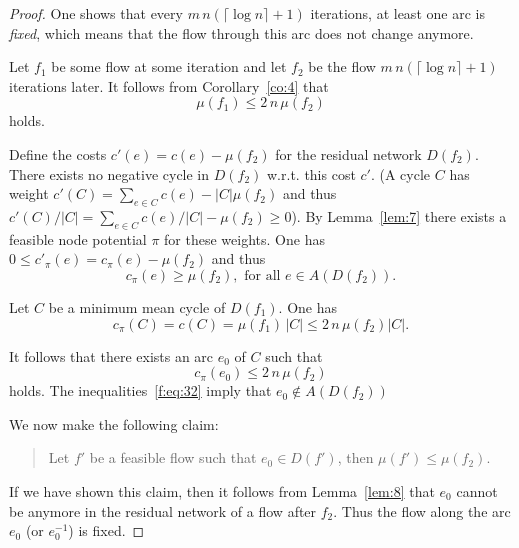 \begin{proof}
  One shows that every $m\, n  (\lceil\log n\rceil+1)$ iterations, at least one
  arc is \emph{fixed}, which means that the flow through  this arc
  does not change anymore. 
  
  Let $f_1$ be some flow at some iteration and let $f_2$ be the flow
  $m\, n  (\lceil\log n\rceil+1)$ iterations later. 
  It follows from Corollary~\ref{co:4} that 
  \begin{equation}
    \label{f:eq:33}
    \mu(f_1)\leq 2 \, n \, \mu(f_2) 
  \end{equation}
  holds. 
  
  Define the costs $c'(e) = c(e) - \mu(f_2)$ for the residual network
  $D(f_2)$. There exists no negative cycle in $D(f_2)$ w.r.t. this
  cost $c'$. (A cycle $C$ has weight $c'(C) = \sum_{e\in C} c(e) - |C|
  \mu(f_2)$ and thus $c'(C) / |C| = \sum_{e\in C} c(e) / |C| - \mu(f_2)\geq0$).
  By Lemma~\ref{lem:7} there exists a feasible node potential $\pi$ for
  these weights. One has $0 \leq c'_\pi(e) = c_\pi(e) - \mu(f_2)$ and thus
  \begin{equation}
    \label{f:eq:32}
     c_\pi(e) \geq \mu(f_2), \text{ for all } e \in A(D(f_2)). 
  \end{equation}

  Let $C$ be a minimum mean cycle of $D(f_1)$. One has
  \begin{equation}
    \label{f:eq:34}
    c_\pi(C) = c(C) = \mu(f_1) \, |C| \leq 2 \, n \, \mu(f_2) |C|.
  \end{equation}
  
  It follows that there exists an arc $e_0$ of $C$ such that
  \begin{equation}
    \label{f:eq:36}
    c_\pi(e_0)\leq 2 \, n \, \mu(f_2)
  \end{equation}
  holds. The inequalities~\eqref{f:eq:32}
  imply that  $e_0 \notin A(D(f_2))$ 

  We now make the following
  claim:
  \begin{quote}
    Let $f'$ be a feasible flow such that $e_0 \in D(f')$, then 
    $\mu(f') \leq    \mu(f_2)$. 
  \end{quote}
  
  If we have shown this claim, then it follows from Lemma~\ref{lem:8}
  that $e_0$ cannot be anymore in the residual network of a flow after
  $f_2$.  Thus the flow along the arc $e_0$ (or $e_0^{-1}$) is
  fixed. 


\end{proof}
